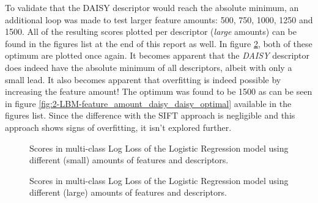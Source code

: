 To validate that the DAISY descriptor would reach the absolute minimum, an additional loop was made to test larger feature amounts: 500, 750, 1000, 1250 and 1500.
All of the resulting scores plotted per descriptor (\emph{large} amounts) can be found in the figures list at the end of this report as well.
In figure \ref{fig:2-LBM-test_scores_best_large}, both of these optimum are plotted once again.
It becomes apparent that the \emph{DAISY} descriptor does indeed have the absolute minimum of all descriptors, albeit with only a small lead.
It also becomes apparent that overfitting is indeed possible by increasing the feature amount!
The optimum was found to be 1500 as can be seen in figure \ref{fig:2-LBM-feature_amount_daisy_daisy_optimal} available in the figures list.
Since the difference with the SIFT approach is negligible and this approach shows signs of overfitting, it isn't explored further.

\begin{figure}[H]
    \centering
    \captionsetup{width=0.65\linewidth}
    \captionsetup{justification=centering}
    \caption{Scores in multi-class Log Loss of the Logistic Regression model using different (small) amounts of features and descriptors.}
    \label{fig:2-LBM-test_scores_best_small}
\end{figure}

\begin{figure}[H]
    \centering
    \captionsetup{width=0.65\linewidth}
    \captionsetup{justification=centering}
    \caption{Scores in multi-class Log Loss of the Logistic Regression model using different (large) amounts of features and descriptors.}
    \label{fig:2-LBM-test_scores_best_large}
\end{figure}


